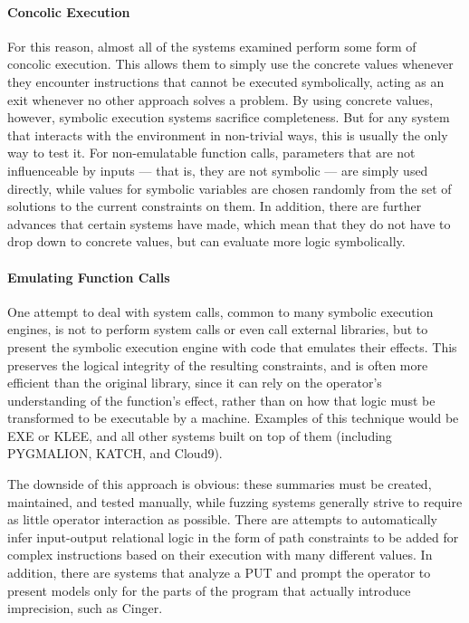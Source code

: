 \documentclass{article}
\begin{document}
\begin{multicols}{2}
    \paragraph{Concolic Execution}
    For this reason, almost all of the systems examined perform some form of concolic execution. This allows them to simply use the concrete values whenever they encounter instructions that cannot be executed symbolically, acting as an exit whenever no other approach solves a problem. By using concrete values, however, symbolic execution systems sacrifice completeness. But for any system that interacts with the environment in non-trivial ways, this is usually the only way to test it. For non-emulatable function calls, parameters that are not influenceable by inputs — that is, they are not symbolic — are simply used directly, while values for symbolic variables are chosen randomly from the set of solutions to the current constraints on them.\cite{PreliminaryAssessment} In addition, there are further advances that certain systems have made, which mean that they do not have to drop down to concrete values, but can evaluate more logic symbolically.

    \paragraph{Emulating Function Calls}
    One attempt to deal with system calls, common to many symbolic execution engines, is not to perform system calls or even call external libraries, but to present the symbolic execution engine with code that emulates their effects. This preserves the logical integrity of the resulting constraints, and is often more efficient than the original library, since it can rely on the operator's understanding of the function's effect, rather than on how that logic must be transformed to be executable by a machine. Examples of this technique would be EXE\cite{EXE} or KLEE\cite{KLEE}, and all other systems built on top of them (including PYGMALION\cite{PYGMALION}, KATCH\cite{KATCH}, and Cloud9\cite{Cloud9}).

    The downside of this approach is obvious: these summaries must be created, maintained, and tested manually, while fuzzing systems generally strive to require as little operator interaction as possible. There are attempts to automatically infer input-output relational logic in the form of path constraints to be added for complex instructions based on their execution with many different values\cite{ASSIE}. In addition, there are systems that analyze a PUT and prompt the operator to present models only for the parts of the program that actually introduce imprecision, such as Cinger\cite{Cinger}.


\end{multicols}
\end{document}
